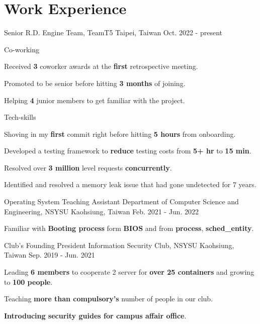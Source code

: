 \section*{Work Experience}
\vspace{-.8em}
\cventry
{Senior R.D.} %
{Engine Team, TeamT5} %
{Taipei, Taiwan} %
{Oct. 2022 - present} %
{
  \begin{cvitem}
    \item {Co-working}
    \vspace*{-5pt}
      \begin{cvitem}
        \item Received \textbf{3} coworker awards at the \textbf{first} retrospective meeting.
        \item Promoted to be senior before hitting \textbf{3 months} of joining.
        \item Helping \textbf{4} junior members to get familiar with the project.
      \end{cvitem}
    \vspace*{-5pt}
    \item {Tech-skills}
    \vspace*{-5pt}
      \begin{cvitem}
        \item Shoving in my \textbf{first} commit right before hitting \textbf{5 hours} from onboarding.
        \item {Developed a testing framework to \textbf{reduce} testing costs from \textbf{5+ hr} to \textbf{15 min}.}
        \item {Resolved over \textbf{3 million} level requests \textbf{concurrently}.}
        \item {Identified and resolved a memory leak issue that had gone undetected for 7 years.}
      \end{cvitem}
    \vspace*{-5pt}
  \end{cvitem}
}

\cventry
{Operating System Teaching Assistant} %
{Department of Computer Science and Engineering, NSYSU} %
{Kaohsiung, Taiwan} %
{Feb. 2021 - Jun. 2022} %
{
  \begin{cvitem}
    \item Familiar with \textbf{Booting process} form \textbf{BIOS} and from \textbf{process}, \textbf{sched\_entity}.   
  \end{cvitem}
}

\cventry
{Club's Founding President} %
{Information Security Club, NSYSU} %
{Kaohsiung, Taiwan} %
{Sep. 2019 - Jun. 2021} %
{
  \begin{cvitem} %
    \item {Leading \textbf{6 members} to cooperate 2 server for \textbf{over 25 containers} and growing to \textbf{100 people}.}
    \item {Teaching \textbf{more than compulsory's} number of people in our club.}
    \item {\textbf{Introducing security guides for campus affair office}.}
  \end{cvitem}
}
